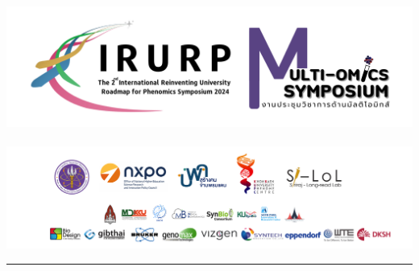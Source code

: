 \documentclass[
]{article}
\author{}
\date{\vspace{-2.5em}}
\begin{document}
\hypertarget{section}{%
\subsection{\texorpdfstring{\protect\includegraphics{Page/elements/img/Logo/Logo_Multi-omics_4.png}}{}}\label{section}}

\includegraphics{Page/elements/img/Logo/Logo_Multi-omics_1.png}

\begin{center}\rule{0.5\linewidth}{0.5pt}\end{center}
\end{document}
